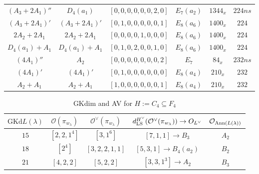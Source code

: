 \documentclass[reqno,12pt]{amsart}
\numberwithin{equation}{section}
\theoremstyle{plain}
\theoremstyle{definition}
\newcommand{\lam}{\lambda}
\renewcommand{\subset}{\subseteq}
\begin{document}
\begin{table}[htbp]
{\begin{tabular}{|c|c|c|c|c|c|}
$(A_3+2A_1)''$ & $D_4(a_1)$
&$[0,0,0,0,0,0,2,0]$& $E_7(a_2)$  &  $ 1344_{x}$  &  $224ns$ \\
$(A_3+2A_1)'$
& $(A_3+2A_1)'$
&$[0,1,0,0,0,0,0,1]$& $E_8(a_6)$  & $ 1400_{x}$  &  $224$ \\
$2A_2+2A_1$
& $2A_2+2A_1$
& $[0,0,0,0,1,0,0,0]$&  $E_8(a_6)$  &  $ 1400_{x}$  &   $224$ \\
$D_4(a_1)+A_1$
&$D_4(a_1)+A_1$
&$[0,1,0,2,0,0,1,0]$ &$E_8(a_6)$  &  $ 1400_{x}$  &  $224$ \\
\hline



$(4A_1)''$
& $A_2$ &$[0,0,0,0,0,0,0,2]$& $E_7$  & $84_{x}$  &   $232ns$ \\

$(4A_1)'$
&$(4A_1)'$
&$[0,1,0,0,0,0,0,0]$& $E_8(a_4)$  & $ 210_{x}$  &   $232$ \\
$A_2+A_1$
&$A_2+A_1$
&$[1,0,0,0,0,0,0,1]$& $E_8(a_4)$  & $ 210_{x}$  &   $232$ \\


\hline








\end{tabular}}
\vspace{0.2cm}
 


	


\end{table}






\begin{table}[htbp]\caption{ GKdim and AV for $H:=C_4\subset F_4$}
	\label{tabc4}
	\centering
	\renewcommand{\arraystretch}{1.5}
	\setlength\tabcolsep{5pt}
	
{	\begin{tabular}{|c|c|c|c|c|}
		\hline $\mathrm{GKd} L(\lambda)$ &    $\mathcal{O}({\pi_{w_{\lam}}})$  &    $\mathcal{O}^{\vee}({\pi_{w_{\lam}}})$  & $d_{\rm LS}^{H^{\vee}}(\mathcal{O}^{\vee}(\pi_{w_\lambda}))\rightarrow    O_{L^\vee}$ & $\mathcal{O}_{{\rm Ann}(L(\lambda))}$ \\ \hline
$15$ 
&  $ [2,2,1^4]$ & $ [3,1^6]$  & \small{$[7,1,1]\rightarrow B_3$}&   $A_2$ \\
\hline

$18$ 
&  $ [2^4]$ & $ [3,2,2,1,1]$ & \small{$[5,3,1]\rightarrow B_4(a_2)$ }&   $B_2$ \\
\hline

$21$ &  $ [4,2,2]$ &  $ [5,2,2]$ & \small{$[3,3,1^3]\rightarrow A_2$}&   $B_3$ \\
\hline

\end{tabular}}
	\bigskip
	

\end{table}
\end{document}
